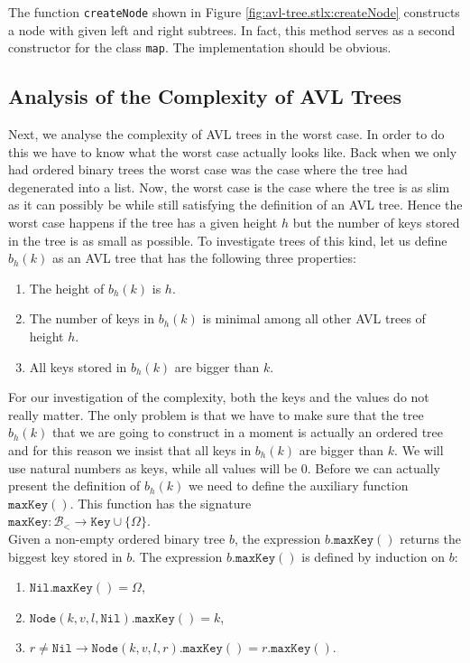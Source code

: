 The function \texttt{createNode} shown in Figure \ref{fig:avl-tree.stlx:createNode}
constructs a node with given left and right subtrees.  In fact, this method serves as a second
constructor for the class \texttt{map}.  The implementation should be obvious.


\subsection{Analysis of the Complexity of AVL Trees}
Next, we analyse the complexity of AVL trees in the worst case.  In order to do this we have to know
what the worst case actually looks like.  Back when we only had ordered binary trees the worst case was the case where
the tree had degenerated into a list.  Now, the worst case is the case where the tree is as slim as
it can possibly be while still satisfying the definition of an AVL tree.  Hence the worst case
happens if the tree has a given height $h$ but the number of keys stored in the tree is as small as
possible.  To investigate trees of this kind, let us define  $b_h(k)$ as an AVL tree that has the following three
properties:
\begin{enumerate}
\item The height of $b_h(k)$ is $h$.
\item The number of keys in $b_h(k)$ is minimal among all other AVL trees of height $h$.  
\item All keys stored in  $b_h(k)$ are bigger than  $k$.  
\end{enumerate}
For our investigation of the
complexity, both the keys and the values do not really matter.  The only problem is that we have to
make sure that the tree $b_h(k)$ that we are going to construct in a moment is actually an ordered
tree and for this reason we insist that all keys in $b_h(k)$ are bigger than $k$.  We will use
natural numbers as keys, while all values will be $0$.
Before we can actually present the definition of  $b_h(k)$ we need to define the auxiliary function
 $\mathtt{maxKey}()$.  This function has the signature 
\\[0.2cm]
\hspace*{1.3cm}
$\mathtt{maxKey}:\mathcal{B}_< \rightarrow \mathtt{Key} \cup \{ \Omega \}$.
\\[0.2cm]
Given a non-empty ordered binary tree  $b$, the expression $b.\mathtt{maxKey}()$ returns the biggest
key stored in $b$.  The expression  $b.\mathtt{maxKey}()$ is defined by induction on $b$:
\begin{enumerate}
\item $\mathtt{Nil}.\mathtt{maxKey}() = \Omega$,
\item $\mathtt{Node}(k,v,l,\mathtt{Nil}).\mathtt{maxKey}() = k$,
\item $r \not= \mathtt{Nil} \rightarrow \mathtt{Node}(k,v,l,r).\mathtt{maxKey}() = r.\mathtt{maxKey}()$.
\end{enumerate}
